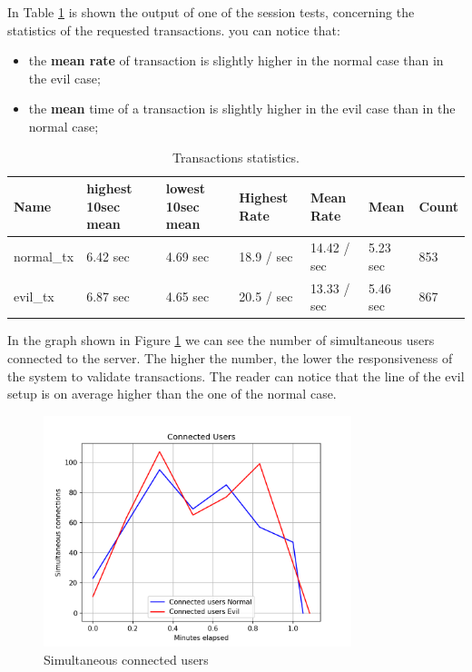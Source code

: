 \documentclass[]{article}
\begin{document}
In Table \ref{bench-main} is shown the output of one of the session tests,  concerning the statistics of the requested transactions. you can notice that:
\begin{itemize}
	\item the \textbf{mean rate} of transaction is slightly higher in the normal case than in the evil case;
	\item the \textbf{mean} time of a transaction is slightly higher in the evil case than in the normal case;
\end{itemize}

\begin{table}[!htb]
\centering
\begin{tabular}{| l | l | l | l | l | l | l |}
	 \hline
	Name  & highest 10sec mean  & lowest 10sec mean & Highest Rate & Mean Rate & Mean  & Count \\
	 \hline
	 normal\_tx  & 6.42 sec  & 4.69 sec  & 18.9 / sec  & 14.42 / sec  & 5.23 sec  & 853 \\	
	 \hline
	 evil\_tx  & 6.87 sec  & 4.65 sec  & 20.5 / sec  & 13.33 / sec  & 5.46 sec  & 867  \\
	 \hline

	\hline
\end{tabular}
\caption{\label{bench-main} Transactions statistics.}
\end{table}
In the graph shown in Figure \ref{simultaneous_users} we can see the number of simultaneous users connected to the server. The higher the number, the lower the responsiveness of the system to validate transactions. The reader can notice that the line of the evil setup is on average higher than the one of the normal case.
\begin{figure}[h]
	\centering
	\includegraphics[width=0.8\textwidth]{simultaneous_users}
	\caption{\label{simultaneous_users} Simultaneous connected users}
\end{figure}
\end{document}
